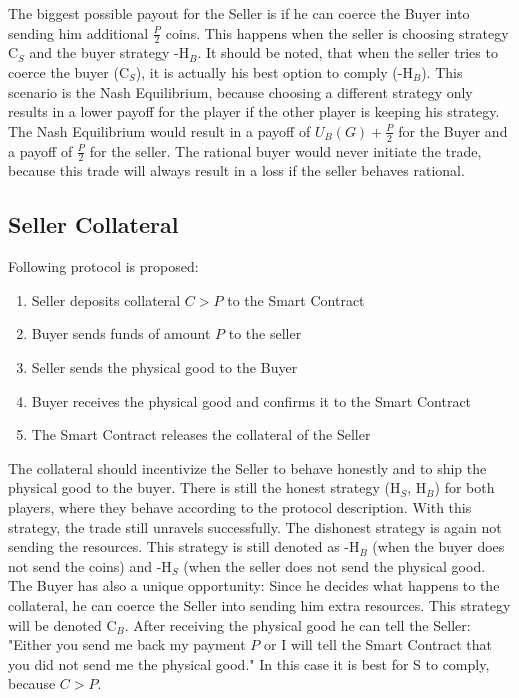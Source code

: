 \documentclass{cacthesis}
\begin{document}
The biggest possible payout for the Seller is if he can coerce the Buyer into sending him additional $\frac{P}{2}$ coins. This happens when the seller is choosing strategy C$_S$ and the buyer strategy -H$_B$.  It should be noted, that when the seller tries to coerce the buyer (C$_S$), it is actually his best option to comply (-H$_B$). This scenario is the Nash Equilibrium, because choosing a different strategy only results in a lower payoff for the player if the other player is keeping his strategy.\newline
The Nash Equilibrium would result in a payoff of $U_B(G) + \frac{P}{2}$ for the Buyer and a payoff of $\frac{P}{2}$ for the seller. The rational buyer would never initiate the trade, because this trade will always result in a loss if the seller behaves rational.

\subsection{Seller Collateral}
Following protocol is proposed:
\begin{enumerate}
    \item Seller deposits collateral $C > P$ to the Smart Contract
    \item Buyer sends funds of amount $P$ to the seller 
    \item Seller sends the physical good to the Buyer
    \item Buyer receives the physical good and confirms it to the Smart Contract
    \item The Smart Contract releases the collateral of the Seller
\end{enumerate}
The collateral should incentivize the Seller to behave honestly and to ship the physical good to the buyer.
There is still the honest strategy (H$_S$, H$_B$) for both players, where they behave according to the protocol description. With this strategy, the trade still unravels successfully.\newline
The dishonest strategy is again not sending the resources. This strategy is still denoted as -H$_B$ (when the buyer does not send the coins) and -H$_S$ (when the seller does not send the physical good.\newline
The Buyer has also a unique opportunity: Since he decides what happens to the collateral, he can coerce the Seller into sending him extra resources. This strategy will be denoted C$_B$.  After receiving the physical good he can tell the Seller: "Either you send me back my payment $P$ or I will tell the Smart Contract that you did not send me the physical good." In this case it is best for S to comply, because $C > P$. \newline
\end{document}
